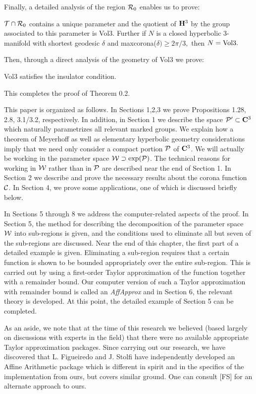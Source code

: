 Finally, a detailed analysis of the region ${\cal R}_0$ 
enables us to prove:

${\cal T} \cap {\cal R}_0$ contains a 
unique parameter and the quotient of ${\bf H}^3$ by the group associated to this parameter is 
{\rm Vol3}.   Further if $N$ is a closed hyperbolic $3$\/{\rm -}\/manifold with 
shortest geodesic $\delta$ and 
{\rm maxcorona(}$\delta) \ge 2\pi/3,$ then $N = {\rm Vol3}.$  
\endproclaim

Then, through a direct analysis of the
geometry of Vol3 we prove:

  {\rm Vol3} satisfies the insulator condition.
\endproclaim

This completes the proof of Theorem 0.2.
 
This paper is organized as follows.  
In Sections 1,2,3 we prove Propositions 1.28, 2.8, 3.1/3.2, 
respectively.  In addition,
in Section 1 we describe the  space 
${\cal P}^\prime \subset {\bf C}^3$ which
naturally parametrizes all relevant marked groups.  
We explain how a theorem of Meyerhoff as
well as elementary hyperbolic geometry considerations imply that we need
only consider a
compact portion ${\cal P}$ of ${\bf C}^3$. We will actually
be working in the parameter space ${\cal W} \supset \exp({\cal P})$.  
The technical reasons for
working in ${\cal W}$ rather than in ${\cal P}$ are
described near the end of Section 1.  In Section 2 we
describe and prove the necessary results about the 
corona function ${\cal C}$.
In Section 4, we prove some applications, one of which is discussed briefly 
below.

In Sections 5 through 8 we address the computer-related aspects of the 
proof.   In Section 5, the method for describing the decomposition of the 
parameter space ${\cal W}$ into sub-regions is given, and the conditions 
used to eliminate all but seven of the sub-regions are discussed.  Near the 
end of this chapter, the first part of a detailed example is given.  Eliminating 
a sub-region requires that a certain function is shown to be bounded 
appropriately over the entire sub-region.  This is carried out by using a 
first-order Taylor approximation of the function together with a 
remainder 
bound.  Our computer version of such a Taylor approximation with remainder bound 
is called an {\it AffApprox} and in Section 6, the relevant theory is 
developed.  At this point, the detailed example of Section 5 can be 
completed.

As an aside,  we note that at  the time of this research we believed (based 
largely on discussions with experts in the field) that there were no available 
appropriate Taylor approximation packages.  
Since carrying out our research, we 
have discovered that L. Figueiredo and J. Stolfi have independently 
developed an Affine Arithmetic package which is different in spirit and in 
the specifics of the implementation from ours, but covers similar 
ground.  One can consult [FS] for an alternate approach to ours.  

